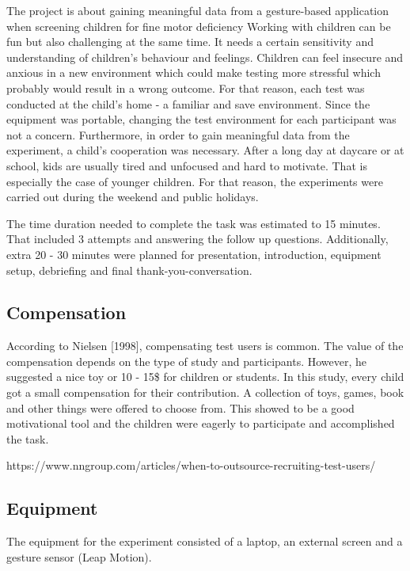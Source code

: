 The project is about gaining meaningful data from a gesture-based application when screening children for fine motor deficiency
Working with children can be fun but also challenging at the same time. It needs a certain sensitivity and understanding of children's behaviour and feelings. Children can feel insecure  and anxious in a new environment which could make testing more stressful which probably would result in a wrong outcome. For that reason, each test was conducted at the child's home - a familiar and save environment. Since the equipment was portable, changing the test environment for each participant was not a concern.
Furthermore, in order to gain meaningful data from the experiment, a child's cooperation was necessary.  After a long day at daycare or at school, kids are usually tired and unfocused and hard to motivate. That is especially the case of younger children. For that reason, the experiments were carried out during the weekend and public holidays.  

The time duration needed to complete the task was estimated to 15 minutes. That included 3 attempts and answering the follow up questions. Additionally, extra 20 - 30 minutes were planned for presentation, introduction, equipment setup, debriefing and final thank-you-conversation.

\subsection{Compensation}

According to Nielsen [1998], compensating test users is common. The value of the compensation depends on the type of study and participants. However, he suggested a nice toy or 10 - 15\$ for children or students.
In this study, every child got a small compensation for their contribution. A collection of toys, games, book and other things were offered to choose from. This showed to be a good motivational tool and the children were eagerly to participate and accomplished the task.  

https://www.nngroup.com/articles/when-to-outsource-recruiting-test-users/



\subsection{Equipment}

The equipment for the experiment consisted of a laptop, an external screen and a gesture sensor (Leap Motion). 

